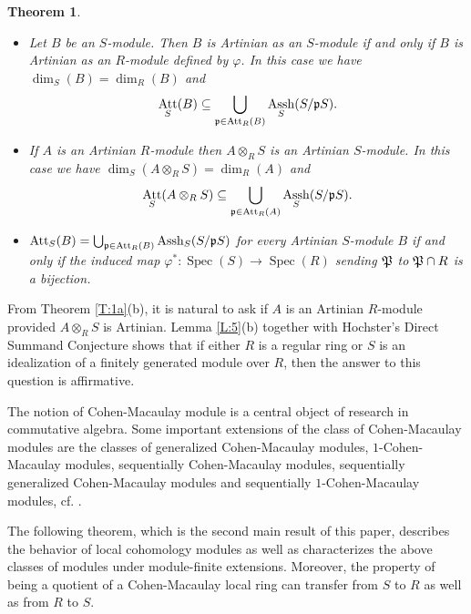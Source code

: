 \documentclass[a4papersize]{article}
\newtheorem{theorem}{Theorem}[section]
\DeclareMathOperator{\Assh}{Assh}
\DeclareMathOperator{\Att}{Att}
\DeclareMathOperator{\Spec}{Spec}
\begin{document}
{\begin{theorem}
\begin{itemize}
\item [{\rm (a)}]  Let	 $B$  be  an $S$-module. Then $B$ is Artinian as an $S$-module if and only if $B$ is   Artinian as an $R$-module defined by $\varphi$. In this case we have $\dim_{S}(B)=\dim_R(B)$ and	$$\Att_S(B)\subseteq\bigcup_{\frak p\in\Att_R(B)}\Assh_S(S/\frak pS).$$	
	
\item [{\rm (b)}] If $A$ is an Artinian $R$-module then $A\otimes_RS$ is an Artinian $S$-module. In this case we have $\dim_S(A\otimes_RS)=\dim_R(A)$ and  					
$$\Att_S(A\otimes_RS)\subseteq\bigcup_{\frak p\in\Att_R(A)}\Assh_S(S/\frak pS).$$ 			
\item [{\rm (c) }]  $\Att_S(B)=\bigcup_{\frak p\in\Att_R(B)}\Assh_S(S/\frak pS)$ for every Artinian $S$-module $B$ if and only if the induced map $\varphi^*:\Spec(S)\to\Spec(R)$ sending $\frak P$ to $\frak P\cap R$ is a bijection.				
\end{itemize}

\end{theorem}
From Theorem \ref{T:1a}(b), it is natural to ask if  $A$ is an Artinian $R$-module provided $A\otimes_RS$ is  Artinian. Lemma \ref{L:5}(b) together with Hochster's Direct Summand Conjecture shows that if either $R$ is a regular ring or $S$ is an idealization of a finitely generated module over $R$, then the answer to this question is  affirmative. 


 The notion of Cohen-Macaulay module is a central object of research in commutative algebra. Some important extensions of the class of    Cohen-Macaulay modules are the classes of   generalized Cohen-Macaulay modules,  $1$-Cohen-Macaulay modules,  sequentially  Cohen-Macaulay modules, sequentially  generalized Cohen-Macaulay modules and sequentially  $1$-Cohen-Macaulay modules, cf. \cite{CSSS, CN, CST, LLN, LN, NDC, Sch, St}.   
 
 The following theorem, which is the second main result of this paper, describes  the behavior of local cohomology modules as well as characterizes the above classes of modules under module-finite extensions. Moreover,  the property of being a quotient of a Cohen-Macaulay local ring can  transfer from $S$ to $R$ as well as from $R$ to $S.$  
 
}
\end{document}

